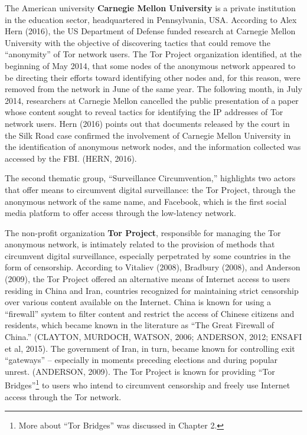 The American university \textbf{Carnegie Mellon University} is a private institution in the education sector, headquartered in Pennsylvania, USA. According to Alex Hern (2016), the US Department of Defense funded research at Carnegie Mellon University with the objective of discovering tactics that could remove the ``anonymity'' of Tor network users. The Tor Project organization identified, at the beginning of May 2014, that some nodes of the anonymous network appeared to be directing their efforts toward identifying other nodes and, for this reason, were removed from the network in June of the same year. The following month, in July 2014, researchers at Carnegie Mellon cancelled the public presentation of a paper whose content sought to reveal tactics for identifying the IP addresses of Tor network users. Hern (2016) points out that documents released by the court in the Silk Road case confirmed the involvement of Carnegie Mellon University in the identification of anonymous network nodes, and the information collected was accessed by the FBI. (HERN, 2016).

The second thematic group, ``Surveillance Circumvention,'' highlights two actors that offer means to circumvent digital surveillance: the Tor Project, through the anonymous network of the same name, and Facebook, which is the first social media platform to offer access through the low-latency network.

The non-profit organization \textbf{Tor Project}, responsible for managing the Tor anonymous network, is intimately related to the provision of methods that circumvent digital surveillance, especially perpetrated by some countries in the form of censorship. According to Vitaliev (2008), Bradbury (2008), and Anderson (2009), the Tor Project offered an alternative means of Internet access to users residing in China and Iran, countries recognized for maintaining strict censorship over various content available on the Internet. China is known for using a ``firewall'' system to filter content and restrict the access of Chinese citizens and residents, which became known in the literature as ``The Great Firewall of China.'' (CLAYTON, MURDOCH, WATSON, 2006; ANDERSON, 2012; ENSAFI et al, 2015). The government of Iran, in turn, became known for controlling exit ``gateways'' -- especially in moments preceding elections and during popular unrest. (ANDERSON, 2009). The Tor Project is known for providing ``Tor Bridges''\footnote{More about ``Tor Bridges'' was discussed in Chapter 2.} to users who intend to circumvent censorship and freely use Internet access through the Tor network.

